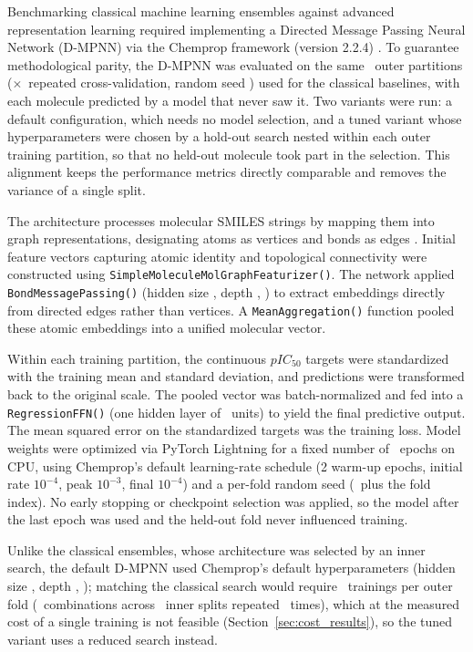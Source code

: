 Benchmarking classical machine learning ensembles against advanced representation learning required implementing a Directed Message Passing Neural Network (D-MPNN) via the Chemprop framework (version 2.2.4) \citep{graff2026, yang2019}. To guarantee methodological parity, the D-MPNN was evaluated on the same \TotalOuterFolds\ outer partitions (\OuterRepeats$\times$\OuterKFolds\ repeated cross-validation, random seed \RandomSeed) used for the classical baselines, with each molecule predicted by a model that never saw it. Two variants were run: a default configuration, which needs no model selection, and a tuned variant whose hyperparameters were chosen by a hold-out search nested within each outer training partition, so that no held-out molecule took part in the selection. This alignment keeps the performance metrics directly comparable and removes the variance of a single split.

The architecture processes molecular SMILES strings by mapping them into graph representations, designating atoms as vertices and bonds as edges \citep{heid2024}. Initial feature vectors capturing atomic identity and topological connectivity were constructed using \texttt{SimpleMoleculeMolGraphFeaturizer()}. The network applied \texttt{BondMessagePassing()} (hidden size \GnnHiddenSize, depth \GnnDepth, \GnnDropoutWord) to extract embeddings directly from directed edges rather than vertices. A \texttt{MeanAggregation()} function pooled these atomic embeddings into a unified molecular vector.

Within each training partition, the continuous $pIC_{50}$ targets were standardized with the training mean and standard deviation, and predictions were transformed back to the original scale. The pooled vector was batch-normalized and fed into a \texttt{RegressionFFN()} (one hidden layer of \GnnHiddenSize\ units) to yield the final predictive output. The mean squared error on the standardized targets was the training loss. Model weights were optimized via PyTorch Lightning for a fixed number of \GnnEpochs\ epochs on CPU, using Chemprop's default learning-rate schedule (2 warm-up epochs, initial rate $10^{-4}$, peak $10^{-3}$, final $10^{-4}$) and a per-fold random seed (\RandomSeed\ plus the fold index). No early stopping or checkpoint selection was applied, so the model after the last epoch was used and the held-out fold never influenced training.

Unlike the classical ensembles, whose architecture was selected by an inner search, the default D-MPNN used Chemprop's default hyperparameters (hidden size \GnnHiddenSize, depth \GnnDepth, \GnnDropoutWord); matching the classical search would require \InnerEvaluationsPerOuterFold\ trainings per outer fold
(\NArchitectureCombos\ combinations across \InnerKFolds\ inner splits repeated \InnerRepeats\ times), which at the measured cost of a single training is not feasible (Section~\ref{sec:cost_results}), so the tuned variant uses a reduced search instead.

